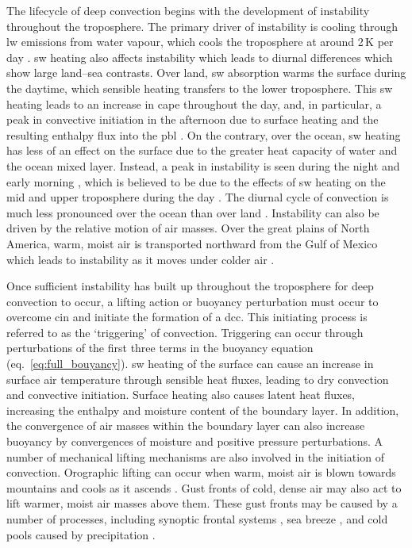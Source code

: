 The lifecycle of deep convection begins with the development of instability throughout the troposphere. 
The primary driver of instability is cooling through \acrshort{lw} emissions from water vapour, which cools the troposphere at around 2\,\unit{K} per day \citep{mapes_water_2001, jeevanjee_simple_2020}. 
\acrshort{sw} heating also affects instability which leads to diurnal differences which show large land--sea contrasts. 
Over land, \acrshort{sw} absorption warms the surface during the daytime, which sensible heating transfers to the lower troposphere. 
This \acrshort{sw} heating leads to an increase in \acrshort{cape} throughout the day, and, in particular, a peak in convective initiation in the afternoon due to surface heating and the resulting enthalpy flux into the \acrshort{pbl} \citep{hendon_diurnal_1993}.
On the contrary, over the ocean, \acrshort{sw} heating has less of an effect on the surface due to the greater heat capacity of water and the ocean mixed layer. 
Instead, a peak in instability is seen during the night and early morning \citep{gray_diurnal_1977}, which is believed to be due to the effects of \acrshort{sw} heating on the mid and upper troposphere during the day \citep{wall_life_2018}. 
The diurnal cycle of convection is much less pronounced over the ocean than over land \citep{soden_diurnal_2000}.
Instability can also be driven by the relative motion of air masses. 
Over the great plains of North America, warm, moist air is transported northward from the Gulf of Mexico which leads to instability as it moves under colder air \citep{walters_airflow_2001}.

Once sufficient instability has built up throughout the troposphere for deep convection to occur, a lifting action or buoyancy perturbation must occur to overcome \acrshort{cin} and initiate the formation of a \acrshort{dcc}.
This initiating process is referred to as the `triggering' of convection.
Triggering can occur through perturbations of the first three terms in the buoyancy equation (eq.~\ref{eq:full_bouyancy}).
\acrshort{sw} heating of the surface can cause an increase in surface air temperature through sensible heat fluxes, leading to dry convection and convective initiation.
Surface heating also causes latent heat fluxes, increasing the enthalpy and moisture content of the boundary layer.
In addition, the convergence of air masses within the boundary layer can also increase buoyancy by convergences of moisture and positive pressure perturbations.
A number of mechanical lifting mechanisms are also involved in the initiation of convection.
Orographic lifting can occur when warm, moist air is blown towards mountains and cools as it ascends \citep{hodges_distribution_1997}. 
Gust fronts of cold, dense air may also act to lift warmer, moist air masses above them. 
These gust fronts may be caused by a number of processes, including synoptic frontal systems \citep{wilson_initiation_1986, jirak_observational_2007}, sea breeze \citep{tripoli_numerical_1979, park_environmental_2020}, and cold pools caused by precipitation \citep{grant_cold_2016}.


